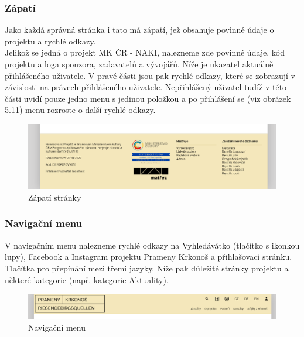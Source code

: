 \subsubsection{Zápatí}
Jako každá správná stránka i tato má zápatí, jež obsahuje povinné údaje o projektu a
rychlé odkazy.\\
Jelikož se jedná o projekt MK ČR - NAKI, nalezneme zde povinné údaje, kód projektu a
loga sponzora, zadavatelů a vývojářů.
Níže je ukazatel aktuálně přihlášeného uživatele.
V pravé části jsou pak rychlé odkazy, které se zobrazují v závislosti na právech přihlášeného uživatele.
Nepřihlášený uživatel tudíž v této části uvidí pouze jedno menu  s jedinou
položkou  a po přihlášení se (viz obrázek 5.11) menu rozroste o další rychlé odkazy.
\begin{figure}[H]
	\centering
	\includegraphics[width=.8\linewidth]{img/zapati.png}
	\caption{Zápatí stránky}
\end{figure}

\pagebreak
\subsubsection{Navigační menu}
V navigačním menu nalezneme rychlé odkazy na Vyhledávátko (tlačítko s ikonkou lupy),
Facebook a Instagram projektu Prameny Krkonoš a přihlašovací stránku. Tlačítka pro
přepínání mezi třemi jazyky. Níže pak důležité stránky projektu a některé kategorie
(např. kategorie Aktuality).
\begin{figure}[H]
	\centering
	\includegraphics[width=.8\linewidth]{img/navigationBar.png}
	\caption{Navigační menu}
\end{figure}

